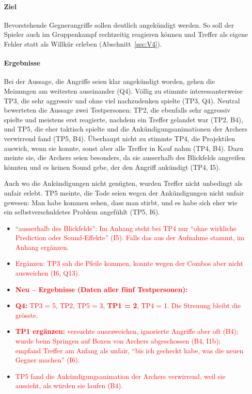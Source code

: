 \documentclass[../Main.tex]{subfiles}
\begin{document}
\paragraph{Ziel}
Bevorstehende Gegnerangriffe sollen deutlich angekündigt werden. So soll der Spieler auch im Gruppenkampf rechtzeitig reagieren können und Treffer als eigene Fehler statt als Willkür erleben (Abschnitt~\ref{sec:V4}).

\paragraph{Ergebnisse}
Bei der Aussage, die Angriffe seien klar angekündigt worden, gehen die Meinungen am weitesten auseinander (Q4). Völlig zu stimmte interessanterweise TP3, die sehr aggressiv und ohne viel nachzudenken spielte (TP3, Q4). Neutral bewerteten die Aussage zwei Testpersonen: TP2, die ebenfalls sehr aggressiv spielte und meistens erst reagierte, nachdem ein Treffer gelandet war (TP2, B4), und TP5, die eher taktisch spielte und die Ankündigungsanimationen der Archers verwirrend fand (TP5, B4). Überhaupt nicht zu stimmte TP4, die Projektilen auswich, wenn sie konnte, sonst aber alle Treffer in Kauf nahm (TP4, B4). Dazu meinte sie, die Archers seien besonders, da sie ausserhalb des Blickfelds angreifen könnten und es keinen Sound gebe, der den Angriff ankündigt (TP4, I5).

Auch wo die Ankündigungen nicht genügten, wurden Treffer nicht unbedingt als unfair erlebt. TP5 meinte, die Tode seien wegen der Ankündigungen nicht unfair gewesen: Man habe kommen sehen, dass man stirbt, und es habe sich eher wie ein selbstverschuldetes Problem angefühlt (TP5, I6).

\begin{itemize}[leftmargin=1.5cm]
    \item \textcolor{red}{\enquote{ausserhalb des Blickfelds}: Im Anhang steht bei TP4 nur \enquote{ohne wirkliche Prediction oder Sound-Effekte} (I5). Falls das aus der Aufnahme stammt, im Anhang ergänzen.}
    \item \textcolor{red}{Ergänzen: TP3 sah die Pfeile kommen, konnte wegen der Combos aber nicht ausweichen (I6, Q13).}
\end{itemize}

\begin{itemize}[leftmargin=1.5cm]
    \item \textcolor{red}{\textbf{Neu -- Ergebnisse (Daten aller fünf Testpersonen):}}
    \item \textcolor{red}{\textbf{Q4:} TP3 = 5, TP2, TP5 = 3, \textbf{TP1 = 2}, TP4 = 1. Die Streuung bleibt die grösste.}
    \item \textcolor{red}{\textbf{TP1 ergänzen:} versuchte auszuweichen, ignorierte Angriffe aber oft (B4); wurde beim Springen auf Boxen von Archers abgeschossen (B4, I1b); empfand Treffer am Anfang als unfair, \enquote{bis ich gecheckt habe, was die neuen Gegner machen} (I6).}
    \item \textcolor{red}{TP5 fand die Ankündigungsanimation der Archers verwirrend, weil sie aussieht, als würden sie laufen (B4).}
\end{itemize}
\end{document}
